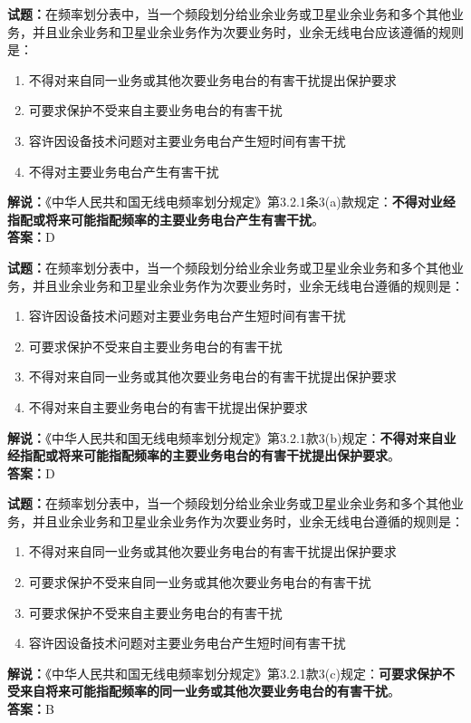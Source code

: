 \documentclass{ctexbook}
\begin{document}
\bigskip


\noindent\textbf{试题：}在频率划分表中，当一个频段划分给业余业务或卫星业余业务和多个其他业务，并且业余业务和卫星业余业务作为次要业务时，业余无线电台应该遵循的规则是：
\begin{enumerate}[leftmargin=3em]
	\item 不得对来自同一业务或其他次要业务电台的有害干扰提出保护要求
	\item 可要求保护不受来自主要业务电台的有害干扰
	\item 容许因设备技术问题对主要业务电台产生短时间有害干扰
	\item 不得对主要业务电台产生有害干扰
\end{enumerate}
\noindent\textbf{解说：}《中华人民共和国无线电频率划分规定》第3.2.1条3(a)款规定：\textbf{不得对业经指配或将来可能指配频率的主要业务电台产生有害干扰}。\\
\textbf{答案：}D




\bigskip


\noindent\textbf{试题：}在频率划分表中，当一个频段划分给业余业务或卫星业余业务和多个其他业务，并且业余业务和卫星业余业务作为次要业务时，业余无线电台遵循的规则是：
\begin{enumerate}[leftmargin=3em]
	\item 容许因设备技术问题对主要业务电台产生短时间有害干扰
	\item 可要求保护不受来自主要业务电台的有害干扰
	\item 不得对来自同一业务或其他次要业务电台的有害干扰提出保护要求
	\item 不得对来自主要业务电台的有害干扰提出保护要求
\end{enumerate}
\noindent\textbf{解说：}《中华人民共和国无线电频率划分规定》第3.2.1款3(b)规定：\textbf{不得对来自业经指配或将来可能指配频率的主要业务电台的有害干扰提出保护要求}。\\\textbf{答案：}D




\bigskip


\noindent\textbf{试题：}在频率划分表中，当一个频段划分给业余业务或卫星业余业务和多个其他业务，并且业余业务和卫星业余业务作为次要业务时，业余无线电台遵循的规则是：
\begin{enumerate}[leftmargin=3em]
	\item 不得对来自同一业务或其他次要业务电台的有害干扰提出保护要求
	\item 可要求保护不受来自同一业务或其他次要业务电台的有害干扰
	\item 可要求保护不受来自主要业务电台的有害干扰
	\item 容许因设备技术问题对主要业务电台产生短时间有害干扰
\end{enumerate}
\noindent\textbf{解说：}《中华人民共和国无线电频率划分规定》第3.2.1款3(c)规定：\textbf{可要求保护不受来自将来可能指配频率的同一业务或其他次要业务电台的有害干扰}。\\
\textbf{答案：}B
\end{document}
